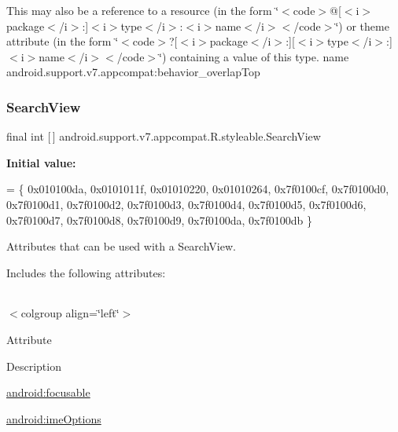 This may also be a reference to a resource (in the form \char`\"{}$<$code$>$@\mbox{[}$<$i$>$package$<$/i$>$\+:\mbox{]}$<$i$>$type$<$/i$>$\+:$<$i$>$name$<$/i$>$$<$/code$>$\char`\"{}) or theme attribute (in the form \char`\"{}$<$code$>$?\mbox{[}$<$i$>$package$<$/i$>$\+:\mbox{]}\mbox{[}$<$i$>$type$<$/i$>$\+:\mbox{]}$<$i$>$name$<$/i$>$$<$/code$>$\char`\"{}) containing a value of this type.  name android.\+support.\+v7.\+appcompat\+:behavior\+\_\+overlap\+Top \mbox{\label{classandroid_1_1support_1_1v7_1_1appcompat_1_1R_1_1styleable_a01af09df9e38f1e4f57165c3d3cee9fe}} 
\subsubsection{\texorpdfstring{Search\+View}{SearchView}}
{\footnotesize\ttfamily final int \mbox{[}$\,$\mbox{]} android.\+support.\+v7.\+appcompat.\+R.\+styleable.\+Search\+View\hspace{0.3cm}{\ttfamily [static]}}

{\bfseries Initial value\+:}
\begin{DoxyCode}
= \{
            0x010100da, 0x0101011f, 0x01010220, 0x01010264,
            0x7f0100cf, 0x7f0100d0, 0x7f0100d1, 0x7f0100d2,
            0x7f0100d3, 0x7f0100d4, 0x7f0100d5, 0x7f0100d6,
            0x7f0100d7, 0x7f0100d8, 0x7f0100d9, 0x7f0100da,
            0x7f0100db
        \}
\end{DoxyCode}
Attributes that can be used with a Search\+View. 

Includes the following attributes\+:

\tabulinesep=1mm
\begin{longtabu} spread 0pt [c]{*{0}{|X[-1]}|}
\hline
\end{longtabu}
$<$colgroup align=\char`\"{}left\char`\"{}$>$ 

Attribute

Description 

{\ttfamily \hyperlink{classandroid_1_1support_1_1v7_1_1appcompat_1_1R_1_1styleable_aafdb0651b761f7d79703c2cbdb007eec}{android\+:focusable}}

{\ttfamily \hyperlink{classandroid_1_1support_1_1v7_1_1appcompat_1_1R_1_1styleable_a532203151aa88d8386a459a3c5a7a355}{android\+:ime\+Options}}

